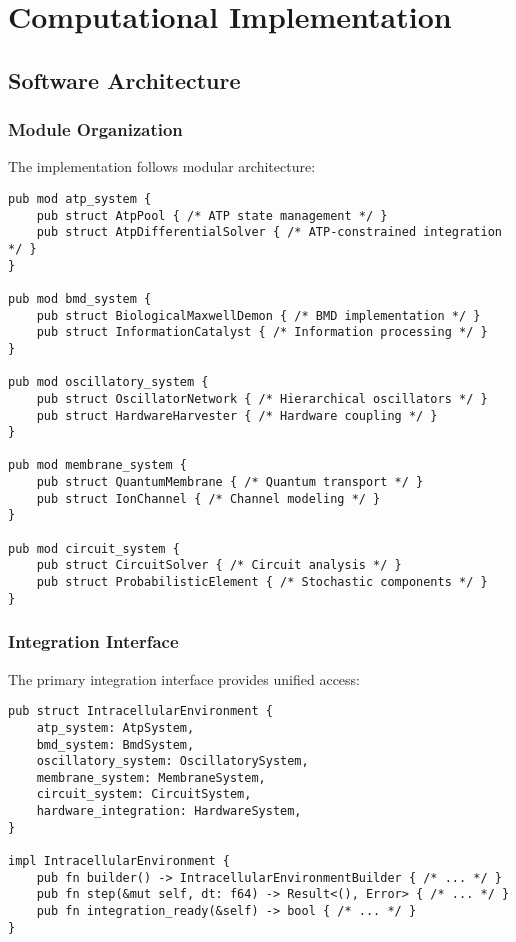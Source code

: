 \documentclass[12pt,a4paper]{article}
\begin{document}
\section{Computational Implementation}

\subsection{Software Architecture}

\subsubsection{Module Organization}

The implementation follows modular architecture:

\begin{lstlisting}[style=ruststyle]
pub mod atp_system {
    pub struct AtpPool { /* ATP state management */ }
    pub struct AtpDifferentialSolver { /* ATP-constrained integration */ }
}

pub mod bmd_system {
    pub struct BiologicalMaxwellDemon { /* BMD implementation */ }
    pub struct InformationCatalyst { /* Information processing */ }
}

pub mod oscillatory_system {
    pub struct OscillatorNetwork { /* Hierarchical oscillators */ }
    pub struct HardwareHarvester { /* Hardware coupling */ }
}

pub mod membrane_system {
    pub struct QuantumMembrane { /* Quantum transport */ }
    pub struct IonChannel { /* Channel modeling */ }
}

pub mod circuit_system {
    pub struct CircuitSolver { /* Circuit analysis */ }
    pub struct ProbabilisticElement { /* Stochastic components */ }
}
\end{lstlisting}

\subsubsection{Integration Interface}

The primary integration interface provides unified access:

\begin{lstlisting}[style=ruststyle]
pub struct IntracellularEnvironment {
    atp_system: AtpSystem,
    bmd_system: BmdSystem,
    oscillatory_system: OscillatorySystem,
    membrane_system: MembraneSystem,
    circuit_system: CircuitSystem,
    hardware_integration: HardwareSystem,
}

impl IntracellularEnvironment {
    pub fn builder() -> IntracellularEnvironmentBuilder { /* ... */ }
    pub fn step(&mut self, dt: f64) -> Result<(), Error> { /* ... */ }
    pub fn integration_ready(&self) -> bool { /* ... */ }
}
\end{lstlisting}
\end{document}
